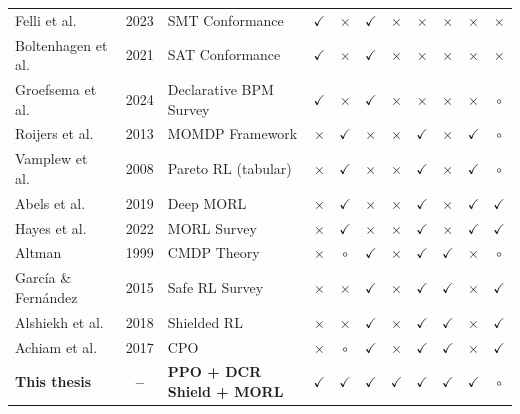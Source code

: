 \begin{table}
\begin{tabular}{@{}l c l *{8}{c}@{}}
Felli et al.~\cite{Felli2023Multi-perspectiveApproach}    & 2023 & SMT Conformance       & $\checkmark$ & $\times$ & $\checkmark$ & $\times$ & $\times$ & $\times$ & $\times$ & $\times$ \\
Boltenhagen et al.~\cite{Boltenhagen2021OptimizedArtefacts} & 2021 & SAT Conformance     & $\checkmark$ & $\times$ & $\checkmark$ & $\times$ & $\times$ & $\times$ & $\times$ & $\times$ \\
Groefsema et al.~\cite{Groefsema2024SupportingFamilies}   & 2024 & Declarative BPM Survey& $\checkmark$ & $\times$ & $\checkmark$ & $\times$ & $\times$ & $\times$ & $\times$ & $\circ$ \\
\addlinespace
Roijers et al.~\cite{Roijers2013ADecision-Making}         & 2013 & MOMDP Framework       & $\times$ & $\checkmark$ & $\times$ & $\times$ & $\checkmark$ & $\times$ & $\checkmark$ & $\circ$ \\
Vamplew et al.~\cite{Vamplew2008OnFronts}                 & 2008 & Pareto RL (tabular)   & $\times$ & $\checkmark$ & $\times$ & $\times$ & $\checkmark$ & $\times$ & $\checkmark$ & $\circ$ \\
Abels et al.~\cite{Abels2019DynamicLearning}              & 2019 & Deep MORL             & $\times$ & $\checkmark$ & $\times$ & $\times$ & $\checkmark$ & $\times$ & $\checkmark$ & $\checkmark$ \\
Hayes et al.~\cite{Hayes2022APlanning}                    & 2022 & MORL Survey           & $\times$ & $\checkmark$ & $\times$ & $\times$ & $\checkmark$ & $\times$ & $\checkmark$ & $\checkmark$ \\
\addlinespace
Altman~\cite{AltmanCONSTRAINEDPROCESSES}                  & 1999 & CMDP Theory           & $\times$ & $\circ$ & $\checkmark$ & $\times$ & $\checkmark$ & $\checkmark$ & $\times$ & $\circ$ \\
García \& Fernández~\cite{Garcia2015ALearning}            & 2015 & Safe RL Survey        & $\times$ & $\times$ & $\checkmark$ & $\times$ & $\checkmark$ & $\checkmark$ & $\times$ & $\checkmark$ \\
Alshiekh et al.~\cite{Alshiekh2017SafeShielding}          & 2018 & Shielded RL           & $\times$ & $\times$ & $\checkmark$ & $\times$ & $\checkmark$ & $\checkmark$ & $\times$ & $\checkmark$ \\
Achiam et al.~\cite{Achiam2017ConstrainedOptimization}    & 2017 & CPO                   & $\times$ & $\circ$ & $\checkmark$ & $\times$ & $\checkmark$ & $\checkmark$ & $\times$ & $\checkmark$ \\
\midrule
\textbf{This thesis} & \textbf{--} & \textbf{PPO + DCR Shield + MORL} & $\checkmark$ & $\checkmark$ & $\checkmark$ & $\checkmark$ & $\checkmark$ & $\checkmark$ & $\checkmark$ & $\circ$ \\
\bottomrule
\end{tabular}
\end{table}


